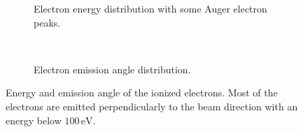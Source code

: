 \begin{figure}[!ht]
	\begin{subfigure}[t]{0.5\textwidth}
		
		\caption{Electron energy distribution with some Auger electron peaks.}
		\label{}
	\end{subfigure}
	~
	\begin{subfigure}[t]{0.5\textwidth}
		
		\caption{Electron emission angle distribution.}
		\label{}
	\end{subfigure}
	\caption[Energy and emission angle of the ionized electrons]{Energy and emission angle of the ionized electrons. Most of the electrons are emitted perpendicularly to the beam direction with an energy below $100\,\mathrm{eV}$.}
	\label{chap3:garfieldangle}
\end{figure}
